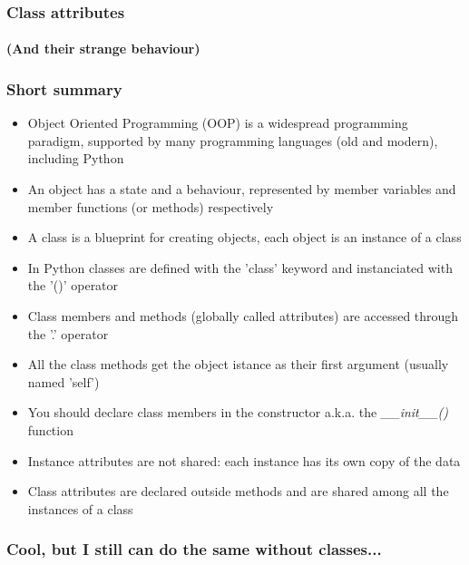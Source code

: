 \documentclass[9pt]{beamer}
\begin{document}
\begin{frame}
  \frametitle{Class attributes}
  \framesubtitle{(And their strange behaviour)}
  
\end{frame}


\begin{frame}
  \frametitle{Short summary}
  
  \begin{itemize}
    \footnotesize
    \item Object Oriented Programming (OOP) is a widespread programming paradigm,
          supported by many programming languages (old and modern), including Python
    \medskip
    \item An object has a state and a behaviour, represented by member variables
          and member functions (or methods) respectively
    \medskip
    \item A class is a blueprint for creating objects, each object is an instance of a class
    \medskip
    \item In Python classes are defined with the 'class' keyword and instanciated with the '()' operator
    \medskip
    \item Class members and methods (globally called attributes) are accessed through the '.' operator
    \medskip
    \item All the class methods get the object istance as their first argument (usually named 'self')
    \medskip
    \item You should declare class members in the constructor a.k.a. the \emph{\_\_init\_\_()} function
    \medskip
    \item Instance attributes are not shared: each instance has its own copy of the data
    \medskip
    \item Class attributes are declared outside methods and are shared among all the instances of a class
  \end{itemize}
  
\end{frame}




\begin{frame}
  \frametitle{Cool, but I still can do the same without classes...}
  
\end{frame}
\end{document}
